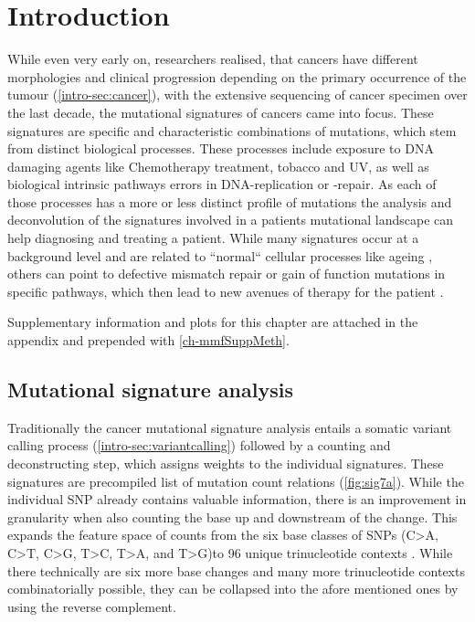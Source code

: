 \section{Introduction}
\label{mmf-sec:intro}

While even very early on, researchers realised, that cancers have different morphologies and clinical progression depending on the primary occurrence of the tumour (\autoref{intro-sec:cancer}), with the extensive sequencing of cancer specimen over the last decade, the mutational signatures of cancers came into focus. These signatures are specific and characteristic combinations of mutations, which stem from distinct biological processes. These processes include exposure to DNA damaging agents like Chemotherapy treatment, tobacco and UV, as well as biological intrinsic pathways errors in DNA-replication or -repair. As each of those processes has a more or less distinct profile of mutations \cite{Hollstein1991,Kucab2019} the analysis and deconvolution of the signatures involved in a patients mutational landscape can help diagnosing and treating a patient. While many signatures occur at a background level and are related to ``normal`` cellular processes like ageing \cite{Alexandrov2013}, others can point to defective mismatch repair or gain of function mutations in specific pathways, which then lead to new avenues of therapy for the patient \cite{OtextquotesingleNeil2017}.

Supplementary information and plots for this chapter are attached in the appendix and prepended with \ref{ch-mmfSuppMeth}.

\subsection{Mutational signature analysis}
Traditionally the cancer mutational signature analysis entails a somatic variant calling process (\autoref{intro-sec:variantcalling}) followed by a counting and deconstructing step, which assigns weights to the individual signatures. These signatures are precompiled list of mutation count relations (\autoref{fig:sig7a}). While the individual SNP already contains valuable information, there is an improvement in granularity when also counting the base up and downstream of the change. This expands the feature space of counts from the six base classes of SNPs (C>A, C>T, C>G, T>C, T>A, and T>G)to 96 unique trinucleotide contexts \cite{Alexandrov2013}. While there technically are six more base changes and many more trinucleotide contexts combinatorially possible, they can be collapsed into the afore mentioned ones by using the reverse complement.

